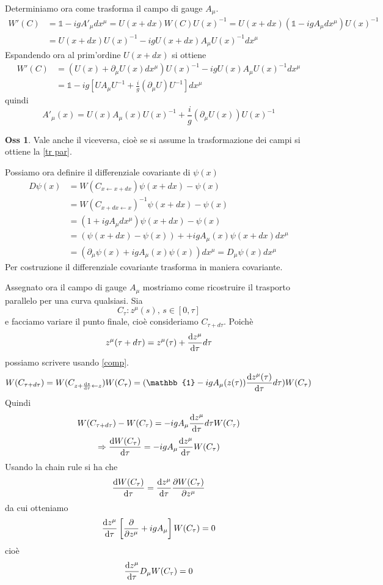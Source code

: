 \documentclass[10pt,a4paper]{article}
\theoremstyle{definition}
\newtheorem{observation}{Oss}[section]
\newcommand{\id}{\mathbb{1}}
\begin{document}
Determiniamo ora come trasforma il campo di gauge $A_\mu$.
\begin{align*}
W'(C) &= \id -  igA'_\mu dx^\mu = U(x + dx)W(C)U(x)^{-1} = U(x + dx)(\id - igA_\mu dx^\mu)U(x)^{-1} \\
&= U(x + dx)U(x)^{-1} - igU(x + dx)A_\mu U(x)^{-1}dx^{\mu}    
\end{align*}
Espandendo ora al prim'ordine $U(x + dx)$ si ottiene
\begin{align*}
    W'(C) &= (U(x) + \partial_\mu U(x)dx^\mu)U(x)^{-1} - igU(x)A_\mu U(x)^{-1}dx^\mu \\
    &= \id - ig [UA_\mu U^{-1} + \frac{i}{g} (\partial_\mu U)U^{-1}]dx^\mu
\end{align*}
quindi
\[
A'_\mu(x) = U(x)A_\mu(x)U(x)^{-1} + \frac{i}{g}(\partial_\mu U(x))U(x)^{-1}    
\]

\begin{observation}
    Vale anche il viceversa, cioè se si assume la trasformazione dei campi si ottiene la \ref{tr par}.
\end{observation}

Possiamo ora definire il differenziale covariante di $\psi(x)$
\begin{align*}
    D\psi(x) &= W(C_{x \leftarrow x + dx})\psi(x + dx) - \psi(x) \\
    &= W(C_{x + dx \leftarrow x})^{-1} \psi(x + dx) - \psi(x) \\
    &= (1 + igA_\mu dx^\mu)\psi(x + dx) - \psi(x) \\
    &= (\psi(x + dx) - \psi(x)) + +igA_\mu(x)\psi(x + dx)dx^\mu \\
    &= (\partial_\mu \psi(x) + igA_\mu (x)\psi(x))dx^\mu = D_\mu \psi(x)dx^\mu
\end{align*}
Per costruzione il differenziale covariante trasforma in maniera covariante.

Assegnato ora il campo di gauge $A_\mu$ mostriamo come ricostruire il trasporto parallelo per una curva qualsiasi. Sia
\[
C_\tau: z^\mu(s),\,s\in [0, \tau]
\]
e facciamo variare il punto finale, cioè consideriamo $C_{\tau + d\tau}$. Poichè
\[
z^\mu(\tau + d\tau) = z^\mu(\tau) + \dv{z^\mu}{\tau} d\tau    
\]
possiamo scrivere usando \ref{comp}.
\[
    W(C_{\tau + d\tau}) = W(C_{z + \dv{z}{\tau}\leftarrow z})W(C_\tau) = (\id - igA_\mu(z(\tau)) \dv{z^\mu(\tau)}{\tau}d\tau)W(C_\tau)
\]
Quindi
\[
W(C_{\tau + d\tau}) - W(C_\tau) = -igA_\mu \dv{z^\mu}{\tau}d\tau W(C_\tau)    
\]
\[
\Rightarrow \dv{W(C_\tau)}{\tau} = -igA_\mu\dv{z^\mu}{\tau}W(C_\tau)    
\]
Usando la chain rule si ha che
\[
\dv{W(C_\tau)}{\tau} = \dv{z^\mu}{\tau} \pdv{W(C_\tau)}{z^\mu}    
\]
da cui otteniamo
\[
\dv{z^\mu}{\tau}\left[\pdv{z^\mu} + igA_\mu\right]W(C_\tau)=0    
\]
cioè
\[
    \dv{z^\mu}{\tau}D_\mu W(C_\tau) = 0
\]
\end{document}
